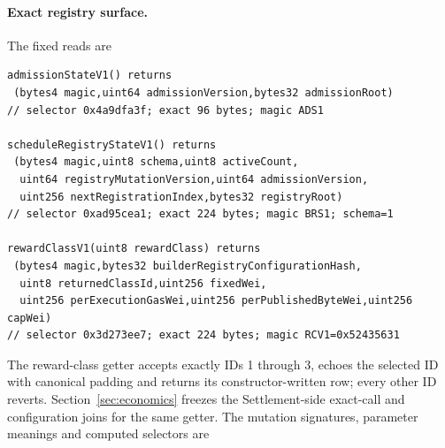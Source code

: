 \documentclass[a4paper,11pt]{article}
\begin{document}
\paragraph{Exact registry surface.}
The fixed reads are
\begin{verbatim}
admissionStateV1() returns
 (bytes4 magic,uint64 admissionVersion,bytes32 admissionRoot)
// selector 0x4a9dfa3f; exact 96 bytes; magic ADS1

scheduleRegistryStateV1() returns
 (bytes4 magic,uint8 schema,uint8 activeCount,
  uint64 registryMutationVersion,uint64 admissionVersion,
  uint256 nextRegistrationIndex,bytes32 registryRoot)
// selector 0xad95cea1; exact 224 bytes; magic BRS1; schema=1

rewardClassV1(uint8 rewardClass) returns
 (bytes4 magic,bytes32 builderRegistryConfigurationHash,
  uint8 returnedClassId,uint256 fixedWei,
  uint256 perExecutionGasWei,uint256 perPublishedByteWei,uint256 capWei)
// selector 0x3d273ee7; exact 224 bytes; magic RCV1=0x52435631
\end{verbatim}
The reward-class getter accepts exactly IDs 1 through 3, echoes the selected
ID with canonical padding and returns its constructor-written row; every other
ID reverts.  Section~\ref{sec:economics} freezes the Settlement-side exact-call
and configuration joins for the same getter.
The mutation signatures, parameter meanings and computed selectors are
\end{document}
